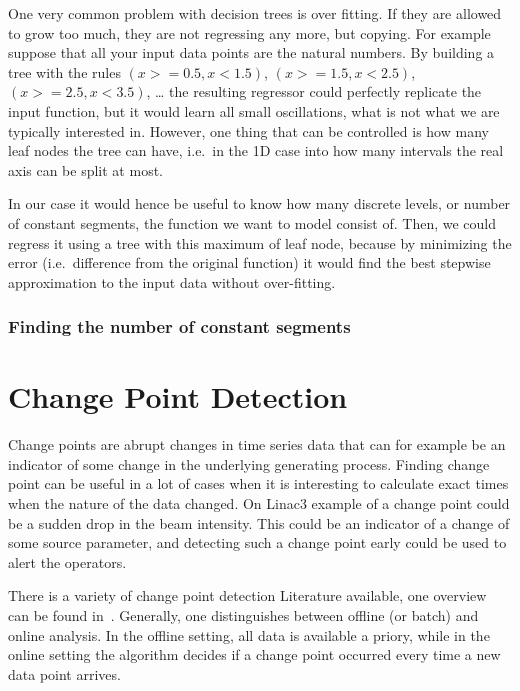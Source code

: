 \documentclass[12pt,a4paper]{article}
\begin{document}
One very common problem with decision trees is over fitting. If they are allowed to grow too much, they are not regressing any more, but copying. For example suppose that all your input data points are the natural numbers. By building a tree with the rules \((x >= 0.5, x <1.5)\), \((x >= 1.5, x <2.5)\), \((x >= 2.5, x <3.5)\), \ldots{} the resulting regressor could perfectly replicate the input function, but it would learn all small oscillations, what is not what we are typically interested in. However, one thing that can be controlled is how many leaf nodes the tree can have, i.e.~in the 1D case into how many intervals the real axis can be split at most.

In our case it would hence be useful to know how many discrete levels, or number of constant segments, the function we want to model consist of. Then, we could regress it using a tree with this maximum of leaf node, because by minimizing the error (i.e.~difference from the original function) it would find the best stepwise approximation to the input data without over-fitting.

\hypertarget{finding-the-number-of-constant-segments}{%
\subsubsection{Finding the number of constant
segments}\label{finding-the-number-of-constant-segments}}

\hypertarget{change-point-detection}{%
\section{Change Point Detection}\label{change-point-detection}}

Change points are abrupt changes in time series data that can for example be an indicator of some change in the underlying generating process. Finding change point can be useful in a lot of cases when it is interesting to calculate exact times when the nature of the data changed. On Linac3 example of a change point could be a sudden drop in the beam intensity. This could be an indicator of a change of some source parameter, and detecting such a change point early could be used to alert the operators.

There is a variety of change point detection Literature available, one overview can be found in~\cite{Aminikhanghahi:surveymethodstime}. Generally, one distinguishes between offline (or batch) and online analysis. In the offline setting, all data is available a priory, while in the online setting the algorithm decides if a change point occurred every time a new data point arrives. 
\end{document}
